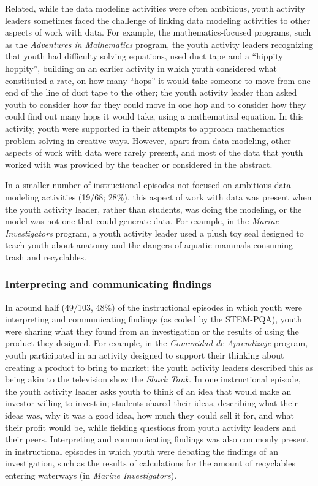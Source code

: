 \documentclass[]{book}
\theoremstyle{definition}
\theoremstyle{definition}
\theoremstyle{definition}
\theoremstyle{remark}
\begin{document}
Related, while the data modeling activities were often ambitious, youth
activity leaders sometimes faced the challenge of linking data modeling
activities to other aspects of work with data. For example, the
mathematics-focused programs, such as the \emph{Adventures in
Mathematics} program, the youth activity leaders recognizing that youth
had difficulty solving equations, used duct tape and a ``hippity
hoppity'', building on an earlier activity in which youth considered
what constituted a rate, on how many ``hops'' it would take someone to
move from one end of the line of duct tape to the other; the youth
activity leader than asked youth to consider how far they could move in
one hop and to consider how they could find out many hops it would take,
using a mathematical equation. In this activity, youth were supported in
their attempts to approach mathematics problem-solving in creative ways.
However, apart from data modeling, other aspects of work with data were
rarely present, and most of the data that youth worked with was provided
by the teacher or considered in the abstract.

In a smaller number of instructional episodes not focused on ambitious
data modeling activities (19/68; 28\%), this aspect of work with data
was present when the youth activity leader, rather than students, was
doing the modeling, or the model was not one that could generate data.
For example, in the \emph{Marine Investigators} program, a youth
activity leader used a plush toy seal designed to teach youth about
anatomy and the dangers of aquatic mammals consuming trash and
recyclables.

\subsubsection{Interpreting and communicating
findings}\label{interpreting-and-communicating-findings}

In around half (49/103, 48\%) of the instructional episodes in which
youth were interpreting and communicating findings (as coded by the
STEM-PQA), youth were sharing what they found from an investigation or
the results of using the product they designed. For example, in the
\emph{Comunidad de Aprendizaje} program, youth participated in an
activity designed to support their thinking about creating a product to
bring to market; the youth activity leaders described this as being akin
to the television show the \emph{Shark Tank}. In one instructional
episode, the youth activity leader asks youth to think of an idea that
would make an investor willing to invest in; students shared their
ideas, describing what their ideas was, why it was a good idea, how much
they could sell it for, and what their profit would be, while fielding
questions from youth activity leaders and their peers. Interpreting and
communicating findings was also commonly present in instructional
episodes in which youth were debating the findings of an investigation,
such as the results of calculations for the amount of recyclables
entering waterways (in \emph{Marine Investigators}).
\end{document}
